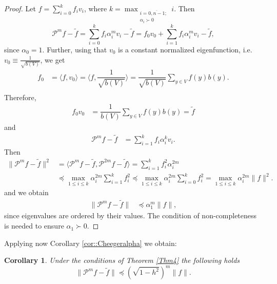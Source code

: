 \documentclass[a4paper,12pt]{amsart}
\newtheorem{corollary}{Corollary}
\theoremstyle{definition}
\renewcommand{\P}{\mathcal{P}}
\newcommand{\weight}{b}
\begin{document}
\begin{proof}
Let $f=\sum\limits_{i=0}^{k}f_i v_i$, where $\displaystyle k=\max_{\substack{i=\overline{0,n-1};\\\alpha_i\succ 0}} i$. Then 
\begin{equation*}
\P^{m} f-\widetilde f=\sum\limits_{i=0}^{k}f_i\alpha_i^m v_i-\widetilde f
=f_0v_0+\sum\limits_{i=1}^{k}f_i\alpha_i^{m} v_i-\widetilde f,
\end{equation*}
since $\alpha_0=1$. Further, 
using that $v_0$ is a constant normalized eigenfunction, i.e. $v_0\equiv \frac{1}{\sqrt{b(V)}}$, we get
\begin{align*}
f_0&=\langle f,v_0\rangle=\langle f, \dfrac{1}{\sqrt{\weight (V)}}\rangle=\dfrac{1}{\sqrt{\weight (V)}} \sum_{y\in V} f(y)\weight (y).\\
\end{align*}
Therefore,
\begin{align*}
f_0v_0&=\dfrac{1}{{\weight (V)}} \sum_{y\in V} f(y)\weight (y)=\widetilde f
\end{align*}
and 
\begin{align*}
\P^{m} f-\widetilde f&=\sum\limits_{i=1}^{k}f_i\alpha_i^{k} v_i.
\end{align*}
Then 
\begin{align*}
\|\P^{m} f-\widetilde f\|^2&=\langle \P^{m} f-\widetilde f, \P^{2m} f-\widetilde f\rangle=\sum\limits_{i=1}^{k}f_i^2\alpha_i^{2m}\\
&\preceq \max_{1\le i\le k}\alpha_i^{2m}\sum\limits_{i=1}^{k}f_i^2\preceq \max_{1\le i\le k} \alpha_i^{2m}\sum\limits_{i=0}^{k}f_i^2=\max_{1\le i\le k} \alpha_i^{2m}\|f\|^2.
\end{align*}
and we obtain
\begin{align*}
\|{\P^m} f-\widetilde f\|&\preceq \alpha_1^{m}\|f\|,
\end{align*}
since eigenvalues are ordered by their values. The condition of non-completeness is needed to ensure $\alpha_1\succ 0$.
\end{proof}
Applying now Corollary \ref{cor::Cheegeralpha} we obtain:
\begin{corollary}
Under the conditions of Theorem \ref{Thm4} the following holds
$$
\|\P^{m} f - \widetilde f\|\preceq \left(\sqrt{1-h^2}\right)^m \|f\|.
$$
\end{corollary}
\end{document}
